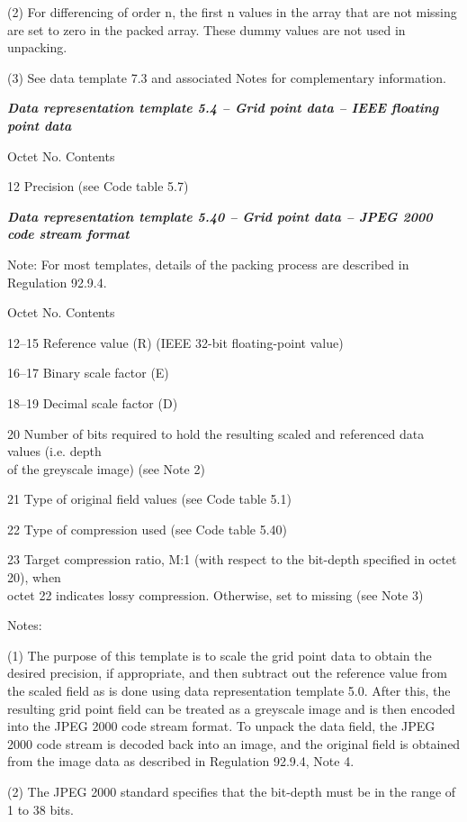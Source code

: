 (2) For differencing of order n, the first n values in the array that are not missing are set to zero in the packed array. These dummy values are not used in unpacking.

(3) See data template 7.3 and associated Notes for complementary information.

\emph{\textbf{Data representation template 5.4 -- Grid point data -- IEEE floating point data}}

Octet No. Contents

12 Precision (see Code table 5.7)

\emph{\textbf{Data representation template 5.40 -- Grid point data -- JPEG 2000 code stream format}}

Note: For most templates, details of the packing process are described in Regulation 92.9.4.

Octet No. Contents

12--15 Reference value (R) (IEEE 32-bit floating-point value)

16--17 Binary scale factor (E)

18--19 Decimal scale factor (D)

20 Number of bits required to hold the resulting scaled and referenced data values (i.e. depth\\
of the greyscale image) (see Note 2)

21 Type of original field values (see Code table 5.1)

22 Type of compression used (see Code table 5.40)

23 Target compression ratio, M:1 (with respect to the bit-depth specified in octet 20), when\\
octet 22 indicates lossy compression. Otherwise, set to missing (see Note 3)

Notes:

(1) The purpose of this template is to scale the grid point data to obtain the desired precision, if appropriate, and then subtract out the reference value from the scaled field as is done using data representation template 5.0. After this, the resulting grid point field can be treated as a greyscale image and is then encoded into the JPEG 2000 code stream format. To unpack the data field, the JPEG 2000 code stream is decoded back into an image, and the original field is obtained from the image data as described in Regulation 92.9.4, Note 4.

(2) The JPEG 2000 standard specifies that the bit-depth must be in the range of 1 to 38 bits.

